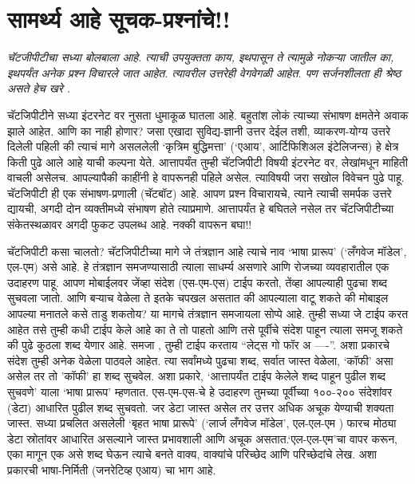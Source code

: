 \chapter{सामर्थ्य आहे सूचक-प्रश्नांचे!!}

{\textit{चॅटजीपीटीचा सध्या बोलबाला आहे.  त्याची उपयुक्तता काय,  इथपासून ते त्यामुळे नोकऱ्या जातील का,  इथपर्यंत अनेक प्रश्न विचारले जात आहेत.  त्यावरील उत्तरेही वेगवेगळी आहेत.  पण सर्जनशीलता ही श्रेष्ठ असते हेच खरे .  }}

\vspace{1.5em}

चॅटजिपीटीने सध्या इंटरनेट वर नुसता धुमाकूळ घातला आहे. बहुतांश लोकं त्याच्या संभाषण क्षमतेने अवाक झाले आहेत. आणि का नाही होणार? जसा एखादा सुविद्य-ज्ञानी उत्तर देईल तशी, व्याकरण-योग्य उत्तरे दिलेली पहिली की त्याचं मागे असललेली `कृत्रिम बुद्धिमत्ता' (`एआय', आर्टिफिशिअल इंटेलिजन्स) हे क्षेत्र किती पुढे आले आहे याची कल्पना येते. आत्तापर्यंत तुम्ही चॅटजिपीटी विषयी इंटरनेट वर, लेखांमधून माहिती वाचली असेलच. आपल्यापैकी काहींनी हे वापरूनही पहिले असेल. त्याविषयी जरा सखोल विवेचन पुढे पाहू. चॅटजिपीटी ही एक संभाषण-प्रणाली (चॅटबॉट) आहे. आपण प्रश्न विचारायचे, त्याने त्याची समर्पक उत्तरे द्यायची, अगदी दोन व्यक्तीमध्ये संभाषण होते त्याप्रमाणे. आत्तापर्यंत हे बघितले नसेल तर चॅटजिपीटीच्या संकेतस्थळावर अगदी फुकट उपलब्ध आहे. नक्की वापरून बघा!!

चॅटजिपीटी कसा चालतो?
चॅटजिपीटीच्या मागे जे तंत्रज्ञान आहे त्याचे नाव `भाषा प्रारूप' (`लँगवेज मॉडेल', एल-एम) असे आहे. हे तंत्रज्ञान समजण्यासाठी त्याला साधर्म्य असणारे आणि रोजच्या व्यवहारातील एक उदाहरण पाहू. आपण मोबाईलवर जेंव्हा संदेश (एस-एम-एस) टाईप करतो, तेंव्हा आपल्याही पुढचा शब्द सुचवला जातो. आणि बऱ्याच वेळेला ते इतके चपखल असतात की आपल्याला वाटू शकते की मोबाइल आपल्या मनातले कसे ताडु शकतोय? या मागचे तंत्रज्ञान समजायला सोप्पे आहे. तुम्ही सध्या जे टाईप करत आहेत तसे तुम्ही कधी टाईप केले आहे का ते तो पाहतो आणि तसे पूर्वीचे संदेश पाहून त्याला समजू शकते की पुढे कुठला शब्द येणार आहे. समजा , तुम्ही टाईप करताय ``लेट्स गो फॉर अ ----''. अशा प्रकारचे संदेश तुम्ही अनेक वेळेला पाठवले आहेत. त्या सर्वांमध्ये पुढचा शब्द, सर्वात जास्त वेळेला, `कॉफी' असा असेल तर तो 'कॉफी' हा शब्द सुचवेल. अशा प्रकारे, `आत्तापर्यंत टाईप केलेले शब्द पाहून पुढील शब्द सुचवणे' याला `भाषा प्रारूप' म्हणतात. एस-एम-एस-चे हे उदाहरण तुमच्या पूर्वीच्या १००-२०० संदेशांवर (डेटा) आधारित पुढील शब्द सुचवतो. जर डेटा जास्त असेल तर उत्तर अधिक अचूक येण्याची शक्यता जास्त. सध्या प्रचलित असलेली `बृहत भाषा प्रारूपे' (`लार्ज लँगवेज मॉडेल', एल-एल-एम ) फारच मोठ्या डेटा स्रोतांवर आधारित असल्याने जास्त प्रभावशाली आणि अचूक असतात.`एल-एल-एम'चा वापर करून, एका मागून एक असे शब्द घेऊन त्याचे बनते वाक्य, वाक्यांचे परिच्छेद आणि परिच्छेदांचे लेख. अशा प्रकारची भाषा-निर्मिती (जनरेटिव्ह एआय) चा भाग आहे.

